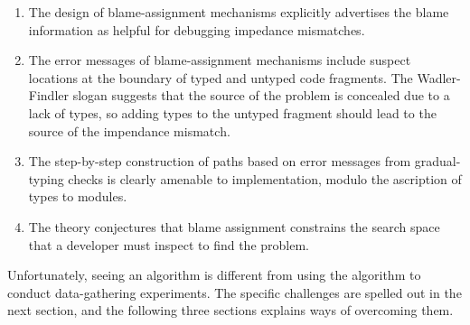 \begin{enumerate}

\item The design of blame-assignment mechanisms explicitly advertises the blame
information as helpful for debugging impedance mismatches.

\item The error messages of blame-assignment mechanisms include suspect
locations at the boundary of typed and untyped code fragments.
The Wadler-Findler slogan suggests that the source of the problem is concealed due to a lack of types, so
adding types to the untyped fragment should lead to the source of the impendance mismatch.

\item The step-by-step construction of paths based on error messages from
gradual-typing checks is clearly amenable to implementation, modulo the
ascription of types to modules.

\item The theory conjectures that blame assignment constrains the search
space that a developer must inspect to find the problem.

\end{enumerate}
Unfortunately, seeing an algorithm is different from using the algorithm to conduct
data-gathering experiments. The specific challenges are spelled out in the next
section, and the following three sections explains ways of overcoming them. 




